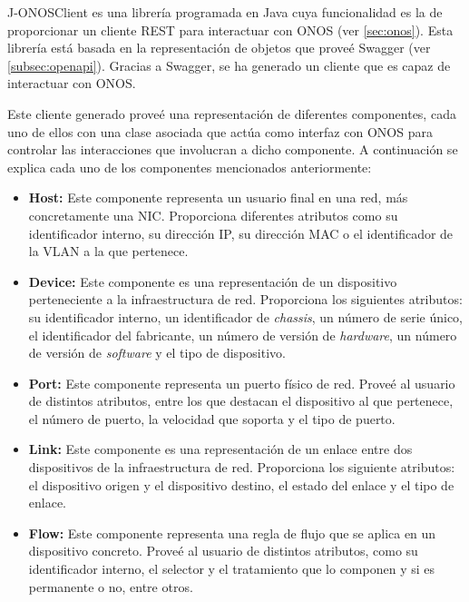 J-ONOSClient\cite{onosjavadocbib} es una librería programada en Java cuya funcionalidad es la de proporcionar un cliente \ac{REST} para interactuar con \ac{ONOS} (ver \ref{sec:onos}). Esta librería está basada en la representación de objetos que proveé Swagger (ver \ref{subsec:openapi}). Gracias a Swagger, se ha generado un cliente que es capaz de interactuar con \ac{ONOS}.

Este cliente generado proveé una representación de diferentes componentes, cada uno de ellos con una clase asociada que actúa como interfaz con \ac{ONOS} para controlar las interacciones que involucran a dicho componente. A continuación se explica cada uno de los componentes mencionados anteriormente:

\begin{itemize}
	
	\item \textbf{Host:} Este componente representa un usuario final en una red, más concretamente una \ac{NIC}. Proporciona diferentes atributos como su identificador interno, su dirección \ac{IP}, su dirección \ac{MAC} o el identificador de la \ac{VLAN} a la que pertenece.
	
	\item \textbf{Device:} Este componente es una representación de un dispositivo perteneciente a la infraestructura de red. Proporciona los siguientes atributos: su identificador interno, un identificador de \textit{chassis}, un número de serie único, el identificador del fabricante, un número de versión de \textit{hardware}, un número de versión de \textit{software} y el tipo de dispositivo. 
	
	\item \textbf{Port:} Este componente representa un puerto físico de red. Proveé al usuario de distintos atributos, entre los que destacan el dispositivo al que pertenece, el número de puerto, la velocidad que soporta y el tipo de puerto.
	
	\item \textbf{Link:} Este componente es una representación de un enlace entre dos dispositivos de la infraestructura de red. Proporciona los siguiente atributos: el dispositivo origen y el dispositivo destino, el estado del enlace y el tipo de enlace.
	
	\item \textbf{Flow:} Este componente representa una regla de flujo que se aplica en un dispositivo concreto. Proveé al usuario de distintos atributos, como su identificador interno, el selector y el tratamiento que lo componen y si es permanente o no, entre otros.
	

\end{itemize}
